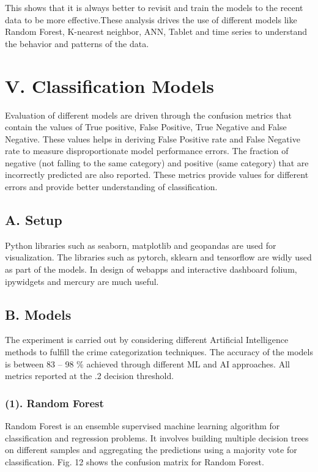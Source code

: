 \documentclass[10 pt,conference,final,]{IEEEtran}
\begin{document}
This shows that it is always better to revisit and train the models to
the recent data to be more effective.These analysis drives the use of
different models like Random Forest, K-nearest neighbor, ANN, Tablet and
time series to understand the behavior and patterns of the data.

\section{V. Classification Models}\label{v.-classification-models}

Evaluation of different models are driven through the confusion metrics
that contain the values of True positive, False Positive, True Negative
and False Negative. These values helps in deriving False Positive rate
and False Negative rate to measure disproportionate model performance
errors. The fraction of negative (not falling to the same category) and
positive (same category) that are incorrectly predicted are also
reported. These metrics provide values for different errors and provide
better understanding of classification.

\subsection{A. Setup}\label{a.-setup}

Python libraries such as seaborn, matplotlib and geopandas are used for
visualization. The libraries such as pytorch, sklearn and tensorflow are
widly used as part of the models. In design of webapps and interactive
dashboard folium, ipywidgets and mercury are much useful.

\subsection{B. Models}\label{b.-models}

The experiment is carried out by considering different Artificial
Intelligence methods to fulfill the crime categorization techniques. The
accuracy of the models is between 83 -- 98 \% achieved through different
ML and AI approaches. All metrics reported at the .2 decision threshold.

\subsubsection{(1). Random Forest}\label{random-forest}

Random Forest is an ensemble supervised machine learning algorithm for
classification and regression problems. It involves building multiple
decision trees on different samples and aggregating the predictions
using a majority vote for classification. Fig. 12 shows the confusion
matrix for Random Forest.
\end{document}
